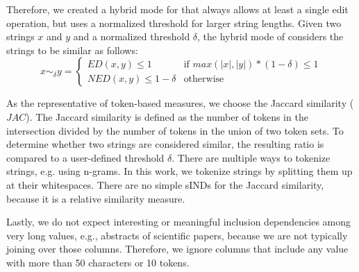 Therefore, we created a hybrid mode for \sawfish that always allows at least a single edit operation, but uses a normalized threshold for larger string lengths.
Given two strings $x$ and $y$ and a normalized threshold $\delta$, the hybrid mode of \sawfish considers the strings to be similar as follows:
\begin{equation*}
    x \sim_\delta y = 
    \begin{cases}
        ED(x, y) \leq 1 & \text{if } max(|x|, |y|) * (1 - \delta) \leq 1 \\
        NED(x, y) \leq 1 - \delta & \text{otherwise}
    \end{cases}
\end{equation*}

As the representative of token-based measures, we choose the Jaccard similarity ($JAC$).
The Jaccard similarity is defined as the number of tokens in the intersection divided by the number of tokens in the union of two token sets.
To determine whether two strings are considered similar, the resulting ratio is compared to a user-defined threshold $\delta$.
There are multiple ways to tokenize strings, e.g. using n-grams.
In this work, we tokenize strings by splitting them up at their whitespaces.
There are no simple sINDs for the Jaccard similarity, because it is a relative similarity measure.

Lastly, we do not expect interesting or meaningful inclusion dependencies among very long values, e.g., abstracts of scientific papers, because we are not typically joining over those columns.
Therefore, we ignore columns that include any value with more than 50 characters or 10 tokens.




